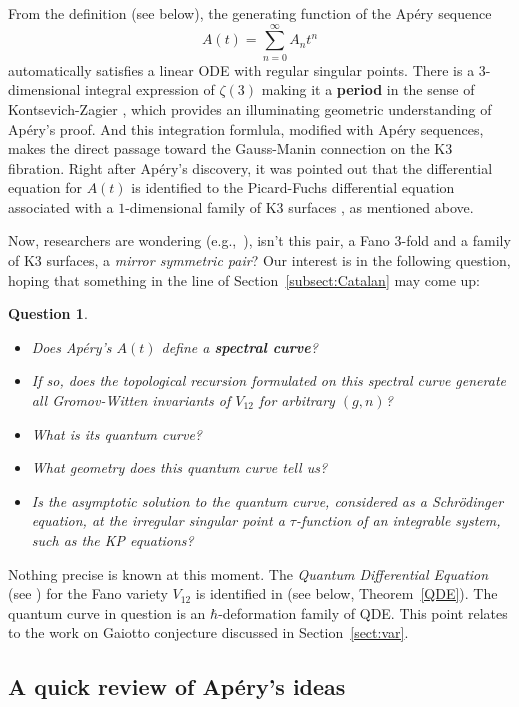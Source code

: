 \documentclass{amsart}
\newtheorem{quest}[thm]{Question}
\theoremstyle{definition}
\numberwithin{equation}{section}
\numberwithin{figure}{section}
\newcommand{\bite}{\begin{itemize}}
\newcommand{\eite}{\end{itemize}}
\begin{document}
From the definition (see below), the generating function of the Ap\'ery sequence 
$$
A(t) = \sum_{n=0}^\infty A_n t^n
$$
automatically satisfies a linear ODE with regular singular points. 
There is a  $3$-dimensional
 integral expression of $\zeta(3)$ making it a \textbf{period} 
 in the sense of Kontsevich-Zagier \cite{KZ},
which provides an illuminating  geometric understanding
of   Ap\'ery's proof. 
And
this integration formlula, modified with Ap\'ery sequences, 
  makes the direct passage toward the 
Gauss-Manin connection on the K3 fibration.
Right after Ap\'ery's discovery, it was pointed out that
the differential equation for $A(t)$ is identified to the Picard-Fuchs 
differential equation associated with a $1$-dimensional 
family of  K3 surfaces \cite{B, BP}, as mentioned above.

Now, researchers are wondering (e.g.,~\cite{Zagier}), isn't this pair, a Fano $3$-fold and
a family of K3 surfaces, a \emph{mirror symmetric pair}?
Our interest is in the following question, hoping that something
in the line of Section~\ref{subsect:Catalan} may come up:

\begin{quest}
\bite
\item Does Ap\'ery's $A(t)$ define a \textbf{spectral curve}?
\item If so, does the
topological recursion formulated on this spectral curve
generate all Gromov-Witten invariants of $V_{12}$ for arbitrary $(g,n)$? 
\item 
What is its quantum curve? 
\item What geometry does this 
quantum curve tell us?
\item Is the asymptotic solution  to the quantum curve,
considered as a Schr\"odinger equation,
at the irregular singular point a $\tau$-function of 
an integrable system, such as the KP equations?

\eite
\end{quest}


Nothing precise is known at this moment. The \emph{Quantum 
Differential Equation} (see \cite{I}) for the Fano variety $V_{12}$ is identified
in \cite{CCGK} (see below, Theorem~\ref{QDE}). The quantum 
curve in question is an $\hbar$-deformation family of QDE. 
This point relates to the  work \cite{DFKMMN} on Gaiotto conjecture 
\cite{Gai2014} discussed in Section~\ref{sect:var}.


\subsection{A quick review of Ap\'ery's ideas}
\label{subsect:Apery}
\end{document}

